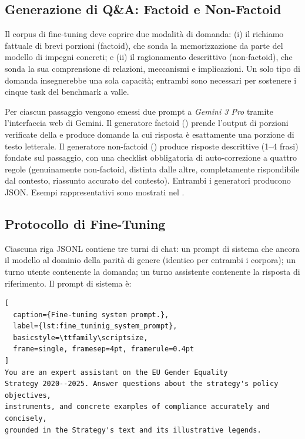 \documentclass[pdflatex, sn-apa]{sn-jnl}%
\theoremstyle{thmstyleone}%
\theoremstyle{thmstyletwo}%
\theoremstyle{thmstylethree}%
\begin{document}
\subsection{Generazione di Q\&A: Factoid e Non-Factoid}
\label{sec:method:qa}

Il corpus di fine-tuning deve coprire due modalità di domanda: (i) il richiamo
fattuale di brevi porzioni (factoid), che sonda la memorizzazione da parte del
modello di impegni concreti; e (ii) il ragionamento descrittivo (non-factoid),
che sonda la sua comprensione di relazioni, meccanismi e implicazioni. Un solo
tipo di domanda insegnerebbe una sola capacità; entrambi sono necessari per
sostenere i cinque task del benchmark a valle.

Per ciascun passaggio vengono emessi due prompt a \textit{Gemini 3 Pro} tramite
l'interfaccia web di Gemini. Il generatore factoid
() prende l'output di porzioni verificate della
 e produce domande la cui risposta è esattamente una
porzione di testo letterale. Il generatore non-factoid
() produce risposte descrittive (1--4 frasi)
fondate sul passaggio, con una checklist obbligatoria di auto-correzione a quattro
regole (genuinamente non-factoid, distinta dalle altre, completamente rispondibile
dal contesto, riassunto accurato del contesto). Entrambi i generatori producono
JSON. Esempi rappresentativi sono mostrati nel .





\subsection{Protocollo di Fine-Tuning}
\label{sec:method:finetune}

Ciascuna riga JSONL contiene tre turni di chat: un prompt di sistema che ancora
il modello al dominio della parità di genere (identico per entrambi i corpora);
un turno utente contenente la domanda; un turno assistente contenente la risposta
di riferimento. Il prompt di sistema è:

\begin{lstlisting}[
  caption={Fine-tuning system prompt.},
  label={lst:fine_tuninig_system_prompt},
  basicstyle=\ttfamily\scriptsize,
  frame=single, framesep=4pt, framerule=0.4pt
]
You are an expert assistant on the EU Gender Equality
Strategy 2020--2025. Answer questions about the strategy's policy objectives,
instruments, and concrete examples of compliance accurately and concisely,
grounded in the Strategy's text and its illustrative legends.
\end{lstlisting}
\end{document}
